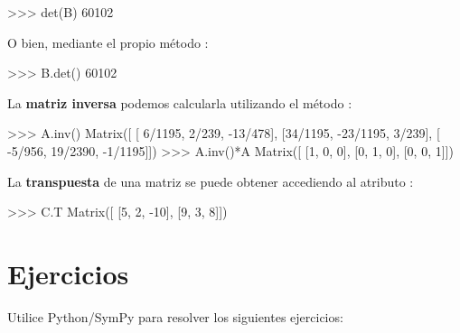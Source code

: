 \begin{python}
>>> det(B)
60102
\end{python}

O bien, mediante el propio método :

\begin{python}
>>> B.det()
60102
\end{python}

La \textbf{matriz inversa} podemos calcularla utilizando el método :

\begin{python}
>>> A.inv()
Matrix([
[ 6/1195,    2/239, -13/478],
[34/1195, -23/1195,   3/239],
[ -5/956,  19/2390, -1/1195]])
>>> A.inv()*A
Matrix([
[1, 0, 0],
[0, 1, 0],
[0, 0, 1]])
\end{python}

La \textbf{transpuesta} de una matriz se puede obtener accediendo al atributo : 

\begin{python}
>>> C.T
Matrix([
[5, 2, -10],
[9, 3,   8]])
\end{python}


\section{Ejercicios}

Utilice Python/SymPy para resolver los siguientes ejercicios:

